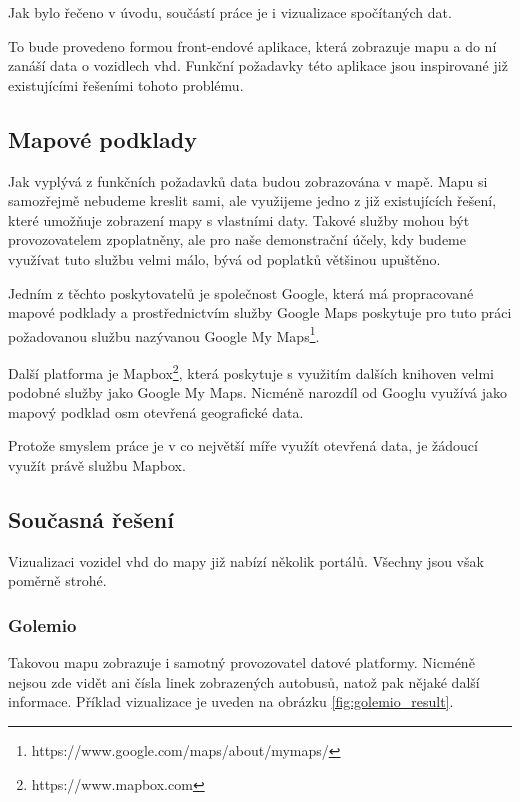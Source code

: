 Jak bylo řečeno v úvodu, součástí práce je i vizualizace spočítaných dat.

\bigbreak

To bude provedeno formou front-endové aplikace, která zobrazuje mapu a do ní zanáší data o vozidlech \gls{vhd}. Funkční požadavky této aplikace jsou inspirované již existujícími řešeními tohoto problému.

\subsection{Mapové podklady}

Jak vyplývá z funkčních požadavků data budou zobrazována v mapě. Mapu si samozřejmě nebudeme kreslit sami, ale využijeme jedno z již existujících řešení, které umožňuje zobrazení mapy s vlastními daty. Takové služby mohou být provozovatelem zpoplatněny, ale pro naše demonstrační účely, kdy budeme využívat tuto službu velmi málo, bývá od poplatků většinou upuštěno.

\bigbreak

Jedním z těchto poskytovatelů je společnost Google, která má propracované mapové podklady a prostřednictvím služby Google Maps poskytuje pro tuto práci požadovanou službu nazývanou Google My Maps\footnote{https://www.google.com/maps/about/mymaps/}.

\bigbreak

Další platforma je Mapbox\footnote{https://www.mapbox.com}, která poskytuje s využitím dalších knihoven velmi podobné služby jako Google My Maps. Nicméně narozdíl od Googlu využívá jako mapový podklad \gls{osm} {otevřená geografické data}.

\bigbreak

Protože smyslem práce je v co největší míře využít otevřená data, je žádoucí využít právě službu Mapbox.

\subsection{Současná řešení} \label{subsection:soucasna_reseni_front_end}

Vizualizaci vozidel \gls{vhd} do mapy již nabízí několik portálů. Všechny jsou však poměrně strohé.

\subsubsection{Golemio}

Takovou mapu zobrazuje i samotný provozovatel datové platformy. Nicméně nejsou zde vidět ani čísla linek zobrazených autobusů, natož pak nějaké další informace. Příklad vizualizace je uveden na obrázku \ref{fig:golemio_result}.

